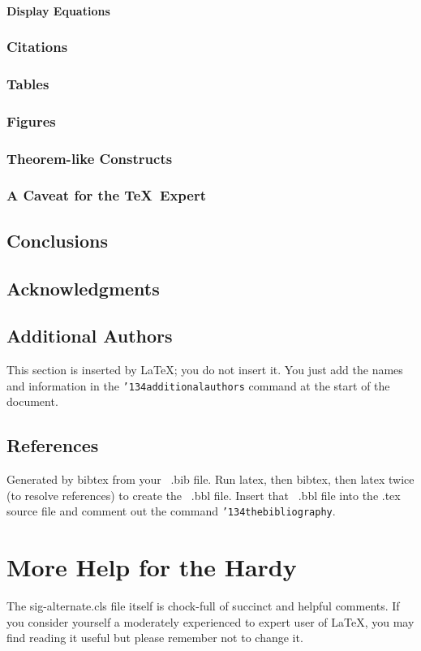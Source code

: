 \documentclass{sig-alternate-05-2015}
\begin{document}
\paragraph{Display Equations}
\subsubsection{Citations}
\subsubsection{Tables}
\subsubsection{Figures}
\subsubsection{Theorem-like Constructs}
\subsubsection*{A Caveat for the \TeX\ Expert}
\subsection{Conclusions}
\subsection{Acknowledgments}
\subsection{Additional Authors}
This section is inserted by \LaTeX; you do not insert it.
You just add the names and information in the
\texttt{{\char'134}additionalauthors} command at the start
of the document.
\subsection{References}
Generated by bibtex from your ~.bib file.  Run latex,
then bibtex, then latex twice (to resolve references)
to create the ~.bbl file.  Insert that ~.bbl file into
the .tex source file and comment out
the command \texttt{{\char'134}thebibliography}.
\section{More Help for the Hardy}
The sig-alternate.cls file itself is chock-full of succinct
and helpful comments.  If you consider yourself a moderately
experienced to expert user of \LaTeX, you may find reading
it useful but please remember not to change it.
\end{document}
